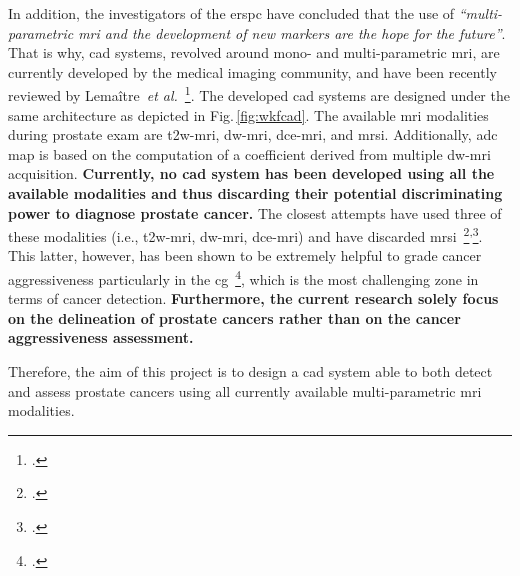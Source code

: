 In addition, the investigators of the \ac{erspc} have concluded that the use of \emph{``multi-parametric \ac{mri} and the development of new markers are the hope for the future''}.
That is why, \ac{cad} systems, revolved around mono- and multi-parametric \ac{mri}, are currently developed by the medical imaging community, and have been recently reviewed by Lema\^itre~\emph{et al.}~\footcite{Lemaitre2015}.
The developed \ac{cad} systems are designed under the same architecture as depicted in Fig.\,\ref{fig:wkfcad}. 
The available \ac{mri} modalities during prostate exam are \ac{t2w}-\ac{mri}, \ac{dw}-\ac{mri}, \ac{dce}-\ac{mri}, and \ac{mrsi}. 
Additionally, \ac{adc} map is based on the computation of a coefficient derived from multiple \ac{dw}-\ac{mri} acquisition.
\textbf{Currently, no \ac{cad} system has been developed using all the available modalities and thus discarding their potential discriminating power to diagnose prostate cancer.}
The closest attempts have used three of these modalities (i.e., \ac{t2w}-\ac{mri}, \ac{dw}-\ac{mri}, \ac{dce}-\ac{mri}) and have discarded \ac{mrsi}~\footcite{Litjens2014}\textsuperscript{,}\footcite{Viswanath2011}.
This latter, however, has been shown to be extremely helpful to grade cancer aggressiveness particularly in the \ac{cg}~\footcite{Vos2015}, which is the most challenging zone in terms of cancer detection.
\textbf{Furthermore, the current research solely focus on the delineation of prostate cancers rather than on the cancer aggressiveness assessment.}



Therefore, the aim of this project is to design a \ac{cad} system able to both detect and assess prostate cancers using all currently available multi-parametric \ac{mri} modalities.


